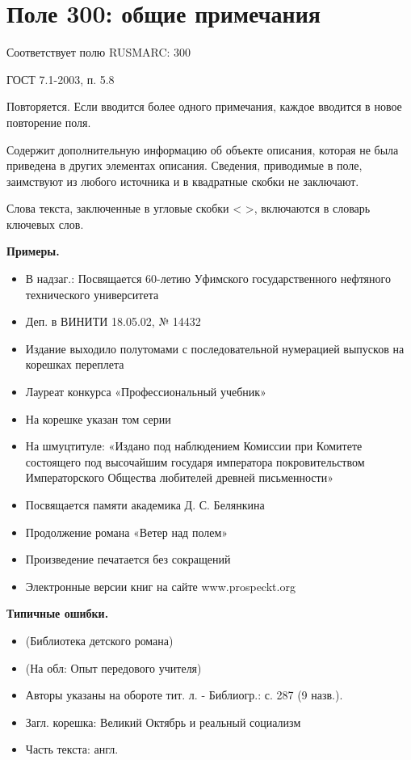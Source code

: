 \chapter*{Поле 300: общие примечания}

Соответствует полю RUSMARC: 300

ГОСТ 7.1-2003, п. 5.8

Повторяется. Если вводится более одного примечания, каждое вводится в новое повторение поля.

Содержит дополнительную информацию об объекте описания, которая не была приведена в других элементах описания. Сведения, приводимые в поле, заимствуют из любого источника и в квадратные скобки не заключают.

Слова текста, заключенные в угловые скобки < >,  включаются в словарь ключевых слов.

\textbf{Примеры.}

\begin{itemize}
	\item В надзаг.: Посвящается 60-летию Уфимского государственного нефтяного технического университета
	\item Деп. в ВИНИТИ 18.05.02, № 14432
	\item Издание выходило полутомами с последовательной нумерацией выпусков на корешках переплета
	\item Лауреат конкурса «Профессиональный учебник»
	\item На корешке указан том серии
	\item На шмуцтитуле: «Издано под наблюдением Комиссии при Комитете состоящего под высочайшим государя императора покровительством Императорского Общества любителей древней письменности»
	\item Посвящается памяти академика Д. С. Белянкина
	\item Продолжение романа «Ветер над полем»
	\item Произведение печатается без сокращений
	\item Электронные версии книг на сайте www.prospeckt.org
\end{itemize}

\textbf{Типичные ошибки.}

\begin{itemize}
	\item (Библиотека детского романа)
	\item (На обл: Опыт передового учителя)
	\item Авторы указаны на обороте тит. л. - Библиогр.: с. 287 (9 назв.).
	\item Загл. корешка: Великий Октябрь и реальный социализм
	\item Часть текста: англ.
\end{itemize}

